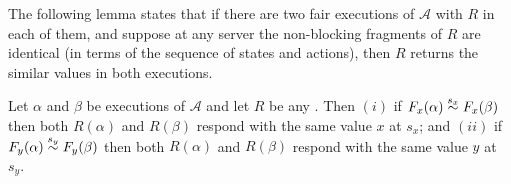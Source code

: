 The following lemma states that if there are two fair executions of $\mathcal{A}$ with \rot{} $R$ in each of them, and suppose at any server the non-blocking fragments of $R$ are identical (in terms of the sequence of states and actions), then $R$ returns the similar values in both executions.
\begin{lemma}[Indistinguishability]  \label{lem:exec3_equiv}
Let $\alpha$ and $\beta$ be executions of $\mathcal{A}$ and let $R$ be any \rot{}. Then 
$(i)$  if $\frage{F_{x}}{\alpha}{} \stackrel{s_x}{\sim}\frage{F_{x}}{\beta}{}$ then both 
$R(\alpha)$ and $R(\beta)$ respond with the same value $x$ at $s_x$; and 
$(ii)$ if  $\frage{F_{y}}{\alpha}{} \stackrel{s_y}{\sim}\frage{F_{y}}{\beta}{}$ then both 
$R(\alpha)$ and $R(\beta)$ respond with the same value $y$ at $s_y$.
\end{lemma}




